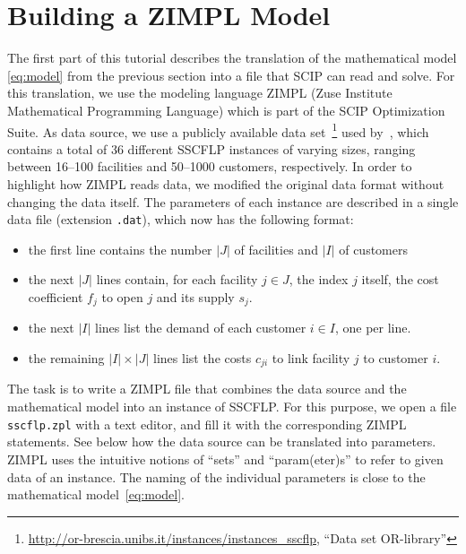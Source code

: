 \documentclass[a4paper,10pt]{article}
\begin{document}
\section{Building a ZIMPL Model}

The first part of this tutorial describes the translation of the mathematical model \eqref{eq:model} from the previous section into a file that SCIP can read and solve.
%
For this translation, we use the modeling language ZIMPL (Zuse Institute Mathematical Programming Language) which is part of the SCIP Optimization Suite.
%
As data source, we use a publicly available data set~\footnote{\url{http://or-brescia.unibs.it/instances/instances_sscflp}, ``Data set OR-library''} used by~\cite{Guastaroba14},
which contains a total of 36 different SSCFLP instances of varying sizes, ranging between 16--100 facilities and 50--1000 customers, respectively.
%
In order to highlight how ZIMPL reads data, we modified the original data format without changing the data itself.
%
The parameters of each instance are described in a single data file (extension \texttt{.dat}), which now has the following format:

\begin{itemize}
  \item the first line contains the number $|J|$ of facilities and $|I|$ of customers
  \item the next $|J|$ lines contain, for each facility $j \in J$, the index $j$ itself, the cost coefficient $f_{j}$ to open $j$ and its supply $s_{j}$.
  \item the next $|I|$ lines list the demand of each customer $i \in I$, one per line.
  \item the remaining $|I| \times |J|$ lines list the costs $c_{ji}$ to link facility $j$ to customer $i$.
\end{itemize}

The task is to write a ZIMPL file that combines the data source and the mathematical model into an instance of SSCFLP.
%
For this purpose, we open a file \texttt{sscflp.zpl} with a text editor, and fill it with the corresponding ZIMPL statements.
%
See below how the data source can be translated into parameters.
%
ZIMPL uses the intuitive notions of ``sets'' and ``param(eter)s''
to refer to given data of an instance.
%
The naming of the individual parameters is close to the mathematical model~\eqref{eq:model}.


  
\end{document}
